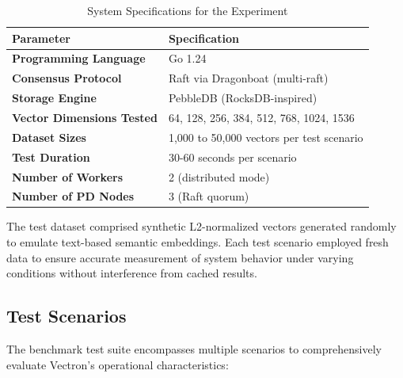 \begin{table}[h!]
\centering
\begin{tabular}{|l|l|}
\hline
\textbf{Parameter} & \textbf{Specification} \\
\hline
\textbf{Programming Language} & Go 1.24 \\
\hline
\textbf{Consensus Protocol} & Raft via Dragonboat (multi-raft) \\
\hline
\textbf{Storage Engine} & PebbleDB (RocksDB-inspired) \\
\hline
\textbf{Vector Dimensions Tested} & 64, 128, 256, 384, 512, 768, 1024, 1536 \\
\hline
\textbf{Dataset Sizes} & 1,000 to 50,000 vectors per test scenario \\
\hline
\textbf{Test Duration} & 30-60 seconds per scenario \\
\hline
\textbf{Number of Workers} & 2 (distributed mode) \\
\hline
\textbf{Number of PD Nodes} & 3 (Raft quorum) \\
\hline
\end{tabular}
\caption{System Specifications for the Experiment}
\end{table}

The test dataset comprised synthetic L2-normalized vectors generated randomly to emulate text-based semantic embeddings. Each test scenario employed fresh data to ensure accurate measurement of system behavior under varying conditions without interference from cached results.

\vspace{5cm}

\subsection{Test Scenarios}

The benchmark test suite encompasses multiple scenarios to comprehensively evaluate Vectron's operational characteristics:

